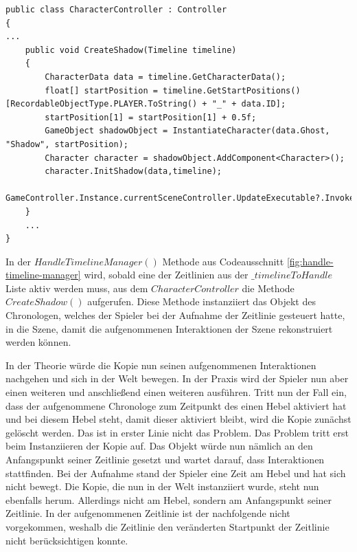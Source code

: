 \begin{lstlisting}[caption={Ausschnitt aus CharacterController.cs Klasse}, label={lst:character-controller}]
public class CharacterController : Controller
{
...
    public void CreateShadow(Timeline timeline)
    {
        CharacterData data = timeline.GetCharacterData();
        float[] startPosition = timeline.GetStartPositions()[RecordableObjectType.PLAYER.ToString() + "_" + data.ID];
        startPosition[1] = startPosition[1] + 0.5f;
        GameObject shadowObject = InstantiateCharacter(data.Ghost, "Shadow", startPosition);
        Character character = shadowObject.AddComponent<Character>();
        character.InitShadow(data,timeline);
        GameController.Instance.currentSceneController.UpdateExecutable?.Invoke();
    }
    ...
}

\end{lstlisting}

In der $HandleTimelineManager()$ Methode aus Codeausschnitt \ref{fig:handle-timeline-manager} wird, sobald eine der Zeitlinien aus der $\_timelineToHandle$ Liste aktiv werden muss, aus dem $CharacterController$ die Methode $CreateShadow()$ aufgerufen. Diese Methode instanziiert das Objekt des Chronologen, welches der Spieler bei der Aufnahme der Zeitlinie gesteuert hatte, in die Szene, damit die aufgenommenen Interaktionen der Szene rekonstruiert werden können.

In der Theorie würde die Kopie nun seinen aufgenommenen Interaktionen nachgehen und sich in der Welt bewegen. 
In der Praxis wird der Spieler nun aber einen weiteren  und anschließend einen weiteren  ausführen. Tritt nun der Fall ein, dass der aufgenommene Chronologe zum Zeitpunkt des  einen Hebel aktiviert hat und bei diesem Hebel steht, damit dieser aktiviert bleibt, wird die Kopie zunächst gelöscht werden. Das ist in erster Linie nicht das Problem. Das Problem tritt erst beim Instanziieren der Kopie auf. Das Objekt würde nun nämlich an den Anfangspunkt seiner Zeitlinie gesetzt und wartet darauf, dass Interaktionen stattfinden. Bei der Aufnahme stand der Spieler eine Zeit am Hebel und hat sich nicht bewegt. Die Kopie, die nun in der Welt instanziiert wurde, steht nun ebenfalls herum. Allerdings nicht am Hebel, sondern am Anfangspunkt seiner Zeitlinie. In der aufgenommenen Zeitlinie ist der nachfolgende  nicht vorgekommen, weshalb die Zeitlinie den veränderten Startpunkt der Zeitlinie nicht berücksichtigen konnte. 

